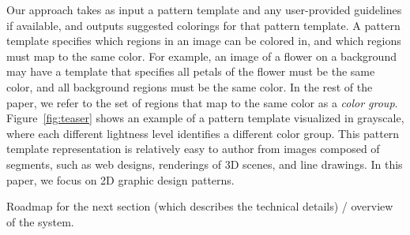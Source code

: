 Our approach takes as input a pattern template and any user-provided guidelines if available, and outputs suggested colorings for that pattern template. A pattern template specifies which regions in an image can be colored in, and which regions must map to the same color. For example, an image of a flower on a background may have a template that specifies all petals of the flower must be the same color, and all background regions must be the same color. In the rest of the paper, we refer to the set of regions that map to the same color as a \emph{color group}. Figure~\ref{fig:teaser} shows an example of a pattern template visualized in grayscale, where each different lightness level identifies a different color group. This pattern template representation is relatively easy to author from images composed of segments, such as web designs, renderings of 3D scenes, and line drawings. In this paper, we focus on 2D graphic design patterns. 



Roadmap for the next section (which describes the technical details) / overview of the system.